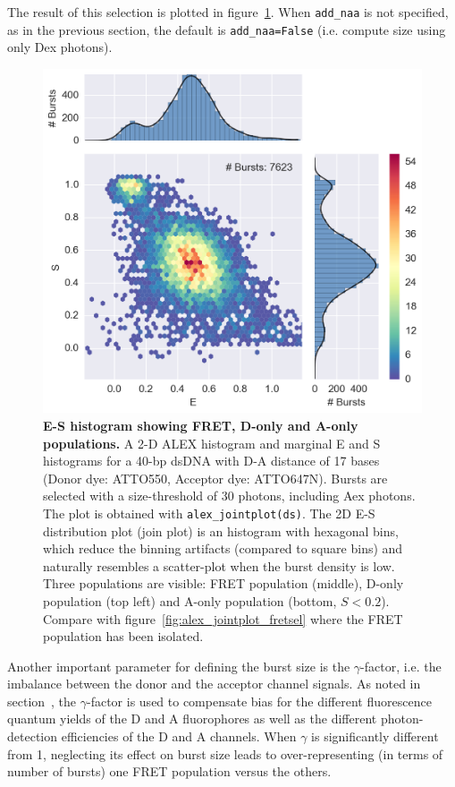 \documentclass[10pt,letterpaper]{article}
\begin{document}
\noindent The result of this selection is plotted in figure~\ref{fig:alex_jointplot}.
When \verb|add_naa| is not specified,
as in the previous section, the default is \verb|add_naa=False|
(i.e. compute size using only Dex photons).

\begin{figure}[h!]
\begin{center}
\includegraphics[width=0.7\columnwidth]{figures/alex_jointplot/alex_jointplot}
\caption{\label{fig:alex_jointplot} \textbf{E-S histogram showing FRET, D-only and A-only populations.}
A 2-D ALEX histogram and marginal E and S histograms for a 40-bp dsDNA
with D-A distance of 17 bases (Donor dye: ATTO550, Acceptor dye: ATTO647N).
Bursts are selected with a size-threshold of 30 photons, including Aex photons.
The plot is obtained with \texttt{alex\_jointplot(ds)}. The 2D E-S distribution plot (join plot)
is an histogram with hexagonal bins, which reduce the binning artifacts (compared to square bins)
and naturally resembles a scatter-plot when the burst density is low.
Three populations are visible: FRET population (middle), D-only population (top left) and
A-only population (bottom, $S < 0.2$). Compare with figure~\ref{fig:alex_jointplot_fretsel}
where the FRET population has been isolated.%
}
\end{center}
\end{figure}


Another important parameter for defining the burst size is the $\gamma$-factor, i.e.
the imbalance between the donor and the acceptor channel signals. As noted in
section~, the $\gamma$-factor is
used to compensate bias for the different fluorescence quantum yields of the D and A
fluorophores as well as the different photon-detection efficiencies of the D and A channels.
When $\gamma$ is significantly different from 1, neglecting its effect on burst size leads to
over-representing (in terms of number of bursts) one FRET population versus the others.
\end{document}
